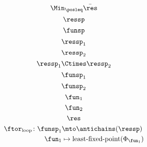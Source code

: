 {\begin{forslides}
\begin{equation}
            \label{eq:opt_6}
            \Min_{\posleq}\bar{\res}
        \end{equation}
        \begin{equation}
            \label{eq:genfun_1}
            \ressp
        \end{equation}
        \begin{equation}
            \label{eq:genfun_2}
            \funsp
        \end{equation}
        \begin{equation}
            \label{eq:genfun_3}
            \ressp_1
        \end{equation}
        \begin{equation}
            \label{eq:genfun_3_1}
            \ressp_2
        \end{equation}
        \begin{equation}
            \label{eq:genfun_3_2}
            \ressp_1\Ctimes \ressp_2
        \end{equation}
        \begin{equation}
            \label{eq:genfun_4}
            \funsp_1
        \end{equation}
        \begin{equation}
            \label{eq:genfun_5}
            \funsp_2
        \end{equation}
        \begin{equation}
            \label{eq:genfun_6}
            \fun_1
        \end{equation}
        \begin{equation}
            \label{eq:genfun_7}
            \fun_2
        \end{equation}
        \begin{equation}
            \label{eq:genfun_8}
            \res
        \end{equation}
        \begin{equation}
            \label{eq:genfun_9}
            \begin{aligned}
                \ftor_\mathrm{loop}\colon \funsp_1 & \mto \antichains(\ressp) \\
                \fun_1                             & \mapsto \text{least-fixed-point}(\Phi_{\fun_1})
            \end{aligned}
        \end{equation}
        \begin{equation}
            \label{eq:genfun_10}
            \begin{aligned}

\end{aligned}
\end{equation}
\end{forslides}}
